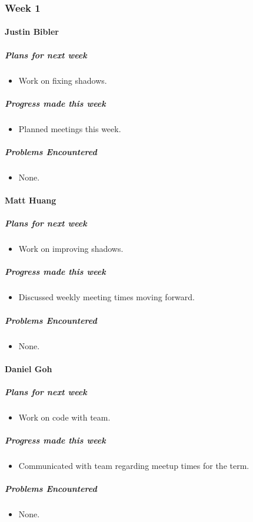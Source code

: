 {
\subsubsection{Week 1}
\paragraph{Justin Bibler}
\subparagraph{Plans for next week}
\begin{itemize}
  \item Work on fixing shadows.
\end{itemize}

\subparagraph{Progress made this week}
\begin{itemize}
  \item Planned meetings this week.
\end{itemize}

\subparagraph{Problems Encountered}
\begin{itemize}
  \item None.
\end{itemize}
\vspace{3mm}

\paragraph{Matt Huang}
\subparagraph{Plans for next week}
\begin{itemize}
  \item Work on improving shadows.
\end{itemize}

\subparagraph{Progress made this week}
\begin{itemize}
  \item Discussed weekly meeting times moving forward.
\end{itemize}

\subparagraph{Problems Encountered}
\begin{itemize}
  \item None.
\end{itemize}

\vspace{3mm}
\paragraph{Daniel Goh}
\subparagraph{Plans for next week}
\begin{itemize}
  \item Work on code with team.
\end{itemize}

\subparagraph{Progress made this week}
\begin{itemize}
  \item Communicated with team regarding meetup times for the term.
\end{itemize}

\subparagraph{Problems Encountered}
\begin{itemize}
  \item None.
\end{itemize}

}

